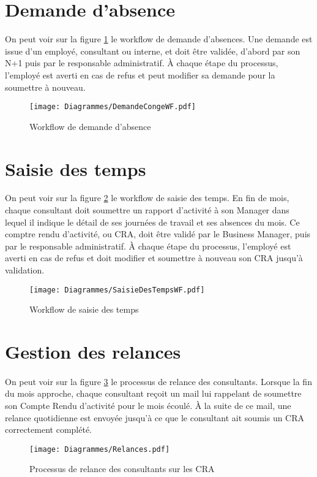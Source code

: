 \section{Demande d'absence}
On peut voir sur la figure \ref{conges} le workflow de demande d'absences. Une demande est issue d'un employé, consultant ou interne, et doit être validée, d'abord par son N+1 puis par le responsable administratif. À chaque étape du processus, l'employé est averti en cas de refus et peut modifier sa demande pour la soumettre à nouveau.
\begin{figure}
	\centering
	\begin{sideways}
		\texttt{[image: Diagrammes/DemandeCongeWF.pdf]}
	\end{sideways}
	\caption{Workflow de demande d'absence}
	\label{conges}
\end{figure}

\section{Saisie des temps}

On peut voir sur la figure \ref{tps} le workflow de saisie des temps. En fin de mois, chaque consultant doit soumettre un rapport d'activité à son Manager dans lequel il indique le détail de ses journées de travail et ses absences du mois. Ce comptre rendu d'activité, ou CRA, doit être validé par le Business Manager, puis par le responsable administratif. À chaque étape du processus, l'employé est averti en cas de refus et doit modifier et soumettre à nouveau son CRA jusqu'à validation.
\begin{figure}
	\centering
	\begin{sideways}
		\texttt{[image: Diagrammes/SaisieDesTempsWF.pdf]}
	\end{sideways}
	\caption{Workflow de saisie des temps}
	\label{tps}
\end{figure}


\section{Gestion des relances}
\paragraph{} On peut voir sur la figure \ref{relances} le processus de relance des consultants. Lorsque la fin du mois approche, chaque consultant reçoit un mail lui rappelant de soumettre son Compte Rendu d'activité pour le mois écoulé. À la suite de ce mail, une relance quotidienne est envoyée jusqu'à ce que le consultant ait soumis un CRA correctement complété.
\begin{figure}
\centering
	\texttt{[image: Diagrammes/Relances.pdf]}
	\caption{Processus de relance des consultants sur les CRA}
	\label{relances}
\end{figure}



